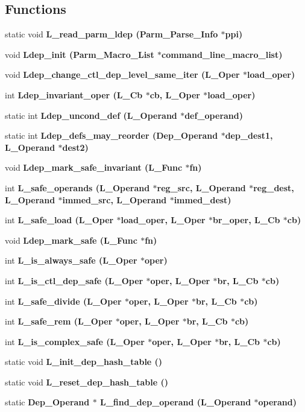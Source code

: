 \subsection*{Functions}
\begin{CompactItemize}
\item 
static void \bf{L\_\-read\_\-parm\_\-ldep} (\bf{Parm\_\-Parse\_\-Info} $\ast$ppi)
\item 
void \bf{Ldep\_\-init} (\bf{Parm\_\-Macro\_\-List} $\ast$command\_\-line\_\-macro\_\-list)
\item 
void \bf{Ldep\_\-change\_\-ctl\_\-dep\_\-level\_\-same\_\-iter} (L\_\-Oper $\ast$load\_\-oper)
\item 
int \bf{Ldep\_\-invariant\_\-oper} (L\_\-Cb $\ast$cb, L\_\-Oper $\ast$load\_\-oper)
\item 
static int \bf{Ldep\_\-uncond\_\-def} (L\_\-Operand $\ast$def\_\-operand)
\item 
static int \bf{Ldep\_\-defs\_\-may\_\-reorder} (\bf{Dep\_\-Operand} $\ast$dep\_\-dest1, L\_\-Operand $\ast$dest2)
\item 
void \bf{Ldep\_\-mark\_\-safe\_\-invariant} (L\_\-Func $\ast$fn)
\item 
int \bf{L\_\-safe\_\-operands} (L\_\-Operand $\ast$reg\_\-src, L\_\-Operand $\ast$reg\_\-dest, L\_\-Operand $\ast$immed\_\-src, L\_\-Operand $\ast$immed\_\-dest)
\item 
int \bf{L\_\-safe\_\-load} (L\_\-Oper $\ast$load\_\-oper, L\_\-Oper $\ast$br\_\-oper, L\_\-Cb $\ast$cb)
\item 
void \bf{Ldep\_\-mark\_\-safe} (L\_\-Func $\ast$fn)
\item 
int \bf{L\_\-is\_\-always\_\-safe} (L\_\-Oper $\ast$oper)
\item 
int \bf{L\_\-is\_\-ctl\_\-dep\_\-safe} (L\_\-Oper $\ast$oper, L\_\-Oper $\ast$br, L\_\-Cb $\ast$cb)
\item 
int \bf{L\_\-safe\_\-divide} (L\_\-Oper $\ast$oper, L\_\-Oper $\ast$br, L\_\-Cb $\ast$cb)
\item 
int \bf{L\_\-safe\_\-rem} (L\_\-Oper $\ast$oper, L\_\-Oper $\ast$br, L\_\-Cb $\ast$cb)
\item 
int \bf{L\_\-is\_\-complex\_\-safe} (L\_\-Oper $\ast$oper, L\_\-Oper $\ast$br, L\_\-Cb $\ast$cb)
\item 
static void \bf{L\_\-init\_\-dep\_\-hash\_\-table} ()
\item 
static void \bf{L\_\-reset\_\-dep\_\-hash\_\-table} ()
\item 
static \bf{Dep\_\-Operand} $\ast$ \bf{L\_\-find\_\-dep\_\-operand} (L\_\-Operand $\ast$operand)

\end{CompactItemize}
